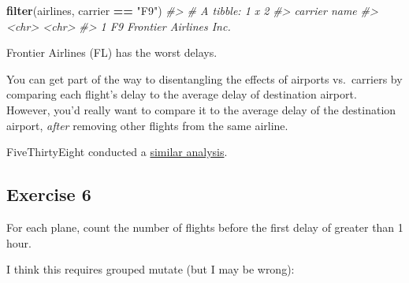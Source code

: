 \documentclass[]{book}
\newenvironment{Shaded}{\begin{snugshade}}{\end{snugshade}}
\newcommand{\CommentTok}[1]{\textcolor[rgb]{0.56,0.35,0.01}{\textit{#1}}}
\newcommand{\DataTypeTok}[1]{\textcolor[rgb]{0.13,0.29,0.53}{#1}}
\newcommand{\DecValTok}[1]{\textcolor[rgb]{0.00,0.00,0.81}{#1}}
\newcommand{\KeywordTok}[1]{\textcolor[rgb]{0.13,0.29,0.53}{\textbf{#1}}}
\newcommand{\NormalTok}[1]{#1}
\newcommand{\OperatorTok}[1]{\textcolor[rgb]{0.81,0.36,0.00}{\textbf{#1}}}
\newcommand{\OtherTok}[1]{\textcolor[rgb]{0.56,0.35,0.01}{#1}}
\newcommand{\StringTok}[1]{\textcolor[rgb]{0.31,0.60,0.02}{#1}}
\theoremstyle{definition}
\theoremstyle{definition}
\theoremstyle{definition}
\theoremstyle{remark}
\begin{document}
\begin{Shaded}
\begin{Highlighting}[]
\KeywordTok{filter}\NormalTok{(airlines, carrier }\OperatorTok{==}\StringTok{ "F9"}\NormalTok{)}
\CommentTok{#> # A tibble: 1 x 2}
\CommentTok{#>   carrier name                  }
\CommentTok{#>   <chr>   <chr>                 }
\CommentTok{#> 1 F9      Frontier Airlines Inc.}
\end{Highlighting}
\end{Shaded}

Frontier Airlines (FL) has the worst delays.

You can get part of the way to disentangling the effects of airports
vs.~carriers by comparing each flight's delay to the average delay of
destination airport. However, you'd really want to compare it to the
average delay of the destination airport, \emph{after} removing other
flights from the same airline.

FiveThirtyEight conducted a
\href{http://fivethirtyeight.com/features/the-best-and-worst-airlines-airports-and-flights-summer-2015-update/}{similar
analysis}.

\hypertarget{exercise-6-1}{%
\subsection{Exercise 6}\label{exercise-6-1}}

For each plane, count the number of flights before the first delay of
greater than 1 hour.

I think this requires grouped mutate (but I may be wrong):

\begin{Shaded}
\end{Shaded}
\end{document}

